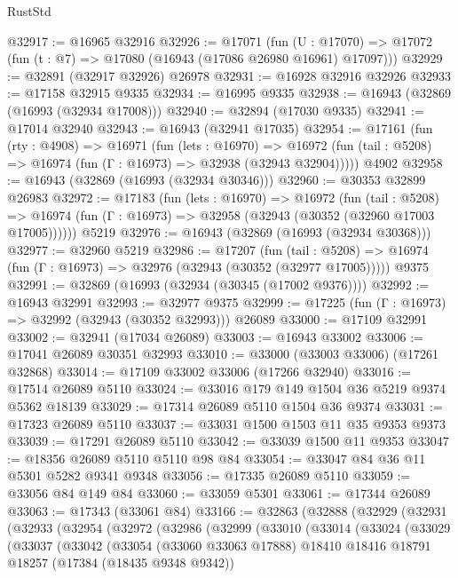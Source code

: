 \begin{lexlean}{RustStd}
\begin{coremodule}
@32917 := @16965 @32916
@32926 := @17071
    (fun (U : @17070) => @17072 (fun (t : @7) => @17080 (@16943 (@17086 @26980 @16961) @17097)))
@32929 := @32891 (@32917 @32926) @26978
@32931 := @16928 @32916 @32926
@32933 := @17158 @32915 @9335
@32934 := @16995 @9335
@32938 := @16943 (@32869 (@16993 (@32934 @17008)))
@32940 := @32894 (@17030 @9335)
@32941 := @17014 @32940
@32943 := @16943 (@32941 @17035)
@32954 := @17161
    (fun (rty : @4908) =>
    @16971
      (fun (lets : @16970) =>
      @16972 (fun (tail : @5208) => @16974 (fun (Γ : @16973) => @32938 (@32943 @32904)))))
    @4902
@32958 := @16943 (@32869 (@16993 (@32934 @30346)))
@32960 := @30353 @32899 @26983
@32972 := @17183
    (fun (lets : @16970) =>
    @16972
      (fun (tail : @5208) =>
      @16974 (fun (Γ : @16973) => @32958 (@32943 (@30352 (@32960 @17003 @17005))))))
    @5219
@32976 := @16943 (@32869 (@16993 (@32934 @30368)))
@32977 := @32960 @5219
@32986 := @17207
    (fun (tail : @5208) => @16974 (fun (Γ : @16973) => @32976 (@32943 (@30352 (@32977 @17005)))))
    @9375
@32991 := @32869 (@16993 (@32934 (@30345 (@17002 @9376))))
@32992 := @16943 @32991
@32993 := @32977 @9375
@32999 := @17225 (fun (Γ : @16973) => @32992 (@32943 (@30352 @32993))) @26089
@33000 := @17109 @32991
@33002 := @32941 (@17034 @26089)
@33003 := @16943 @33002
@33006 := @17041 @26089 @30351 @32993
@33010 := @33000 (@33003 @33006) (@17261 @32868)
@33014 := @17109 @33002 @33006 (@17266 @32940)
@33016 := @17514 @26089 @5110
@33024 := @33016 @179 @149 @1504 @36 @5219 @9374 @5362 @18139
@33029 := @17314 @26089 @5110 @1504 @36 @9374
@33031 := @17323 @26089 @5110
@33037 := @33031 @1500 @1503 @11 @35 @9353 @9373
@33039 := @17291 @26089 @5110
@33042 := @33039 @1500 @11 @9353
@33047 := @18356 @26089 @5110 @5110 @98 @84
@33054 := @33047 @84 @36 @11 @5301 @5282 @9341 @9348
@33056 := @17335 @26089 @5110
@33059 := @33056 @84 @149 @84
@33060 := @33059 @5301
@33061 := @17344 @26089
@33063 := @17343 (@33061 @84)
@33166 := @32863
    (@32888
      (@32929
        (@32931
          (@32933
            (@32954
              (@32972
                (@32986
                  (@32999
                    (@33010
                      (@33014
                        (@33024
                          (@33029
                            (@33037
                              (@33042
                                (@33054
                                  (@33060 @33063 @17888)
                                  @18410
                                  @18416
                                  @18791
                                  @18257
                                  (@17384 (@18435 @9348 @9342))

\end{coremodule}
\end{lexlean}
